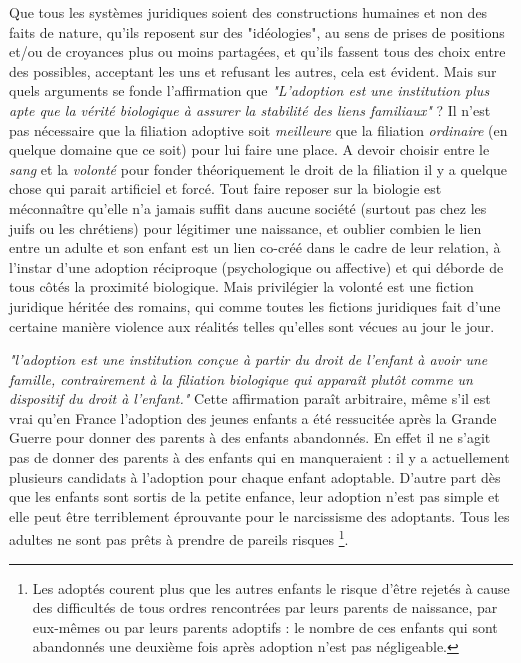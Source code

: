  
 Que tous les systèmes juridiques soient des constructions humaines et non des faits de nature, qu'ils reposent sur des "idéologies", au sens de prises de positions et/ou de croyances plus ou moins partagées, et qu'ils fassent tous des choix entre des possibles, acceptant les uns et refusant les autres, cela est évident. Mais sur quels arguments se fonde l'affirmation que
 \emph{"L'adoption est une institution plus apte que la vérité biologique à assurer la stabilité des liens familiaux"} ?  Il n'est pas nécessaire que la filiation adoptive soit \emph{meilleure} que la filiation \emph{ordinaire} (en quelque domaine que ce soit) pour lui faire une place.  A devoir choisir entre le \emph{sang} et la \emph{volonté} pour fonder théoriquement le droit de la filiation il y a quelque chose qui parait artificiel et forcé.  Tout faire reposer sur la biologie est méconnaître qu'elle n'a jamais suffit dans aucune société (surtout pas chez les juifs ou les chrétiens) pour légitimer une naissance, et oublier combien le lien entre un adulte et son enfant est un lien co-créé dans le cadre de leur relation, à l'instar d'une adoption réciproque (psychologique ou affective) et qui déborde de tous côtés la proximité biologique. Mais privilégier la volonté est une fiction juridique héritée des romains, qui comme toutes les fictions juridiques fait d'une certaine manière violence aux réalités telles qu'elles sont vécues au jour le jour.
 
 \emph{"l'adoption est une institution conçue à partir du droit de l'enfant à avoir une famille, contrairement à la filiation biologique qui apparaît plutôt comme un dispositif du droit à l'enfant."} Cette affirmation paraît arbitraire, même s'il est vrai qu'en France l'adoption des jeunes enfants a été ressucitée après la Grande Guerre pour donner des parents à des enfants abandonnés. En effet il ne s'agit pas de donner des parents à des enfants qui en manqueraient : il y a actuellement plusieurs candidats à l'adoption pour chaque enfant adoptable. D'autre part dès que les enfants sont sortis de la petite enfance, leur adoption n'est pas simple  et elle peut être terriblement éprouvante pour le narcissisme des adoptants. Tous les adultes ne sont pas prêts à prendre de pareils risques \footnote{Les adoptés courent plus que les autres enfants le risque d'être rejetés à cause des difficultés de tous ordres rencontrées par leurs parents de naissance, par eux-mêmes ou par leurs parents adoptifs : le nombre de ces enfants qui sont abandonnés une deuxième fois après adoption n'est pas négligeable.}. 

